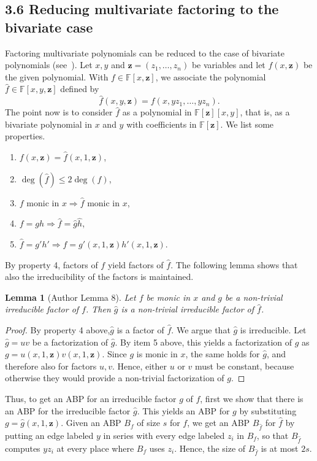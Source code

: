 \documentclass[10pt,a4paper]{article}
\newtheorem{ntlemma}[nttheorem]{Lemma}
\begin{document}
\subsection*{3.6 Reducing multivariate factoring to the bivariate case}
Factoring multivariate polynomials can be reduced to the case of bivariate polynomials (see~\cite{ref12}). Let $x,y$ and $\mathbf z=(z_1,\ldots,z_n)$ be variables and let $f(x,\mathbf z)$ be the given polynomial. With $f\in\mathbb F[x,\mathbf z]$, we associate the polynomial $\widehat f\in\mathbb F[x,y,\mathbf z]$ defined by
\[\widehat f(x,y,\mathbf z)=f(x,yz_1,\ldots,yz_n).\]
The point now is to consider $\widehat f$ as a polynomial in $\mathbb F[\mathbf z][x,y]$, that is, as a bivariate polynomial in $x$ and $y$ with coefficients in $\mathbb F[\mathbf z]$. We list some properties.
\begin{enumerate}\item $f(x,\mathbf z)=\widehat f(x,1,\mathbf z)$,\item $\deg(\widehat f)\leq2\deg(f)$,\item $f\text{ monic in }x\Longrightarrow\widehat f\text{ monic in }x$,\item $f=gh\Longrightarrow\widehat f=\widehat g\widehat h$,\item $\widehat f=g'h'\Longrightarrow f=g'(x,1,\mathbf z)h'(x,1,\mathbf z)$.\end{enumerate}
By property 4, factors of $f$ yield factors of $\widehat f$. The following lemma shows that also the irreducibility of the factors is maintained.
\begin{ntlemma}[Author Lemma 8]
Let $f$ be monic in $x$ and $g$ be a non-trivial irreducible factor of $f$. Then $\widehat g$ is a non-trivial irreducible factor of $\widehat f$.
\end{ntlemma}
\begin{proof}
By property 4 above,$\widehat g$ is a factor of $\widehat f$. We argue that $\widehat g$ is irreducible.
Let $\widehat g=uv$ be a factorization of $\widehat g$. By item 5 above, this yields a factorization of $g$ as $g=u(x,1,\mathbf z)v(x,1,\mathbf z)$. Since $g$ is monic in $x$, the same holds for $\widehat g$, and therefore also for factors $u,v$. Hence, either $u$ or $v$ must be constant, because otherwise they would provide a non-trivial factorization of $g$.
\end{proof}
Thus, to get an ABP for an irreducible factor $g$ of $f$, first we show that there is an ABP for the irreducible factor $\widehat g$. This yields an ABP for $g$ by substituting $g=\widehat g(x,1,\mathbf z)$.
Given an ABP $B_f$ of size $s$ for $f$, we get an ABP $B_{\widehat f}$ for $\widehat f$ by putting an edge labeled $y$ in series with every edge labeled $z_i$ in $B_f$, so that $B_{\widehat f}$ computes $yz_i$ at every place where $B_f$ uses $z_i$. Hence, the size of $B_{\widehat f}$ is at most $2s$.
\end{document}
